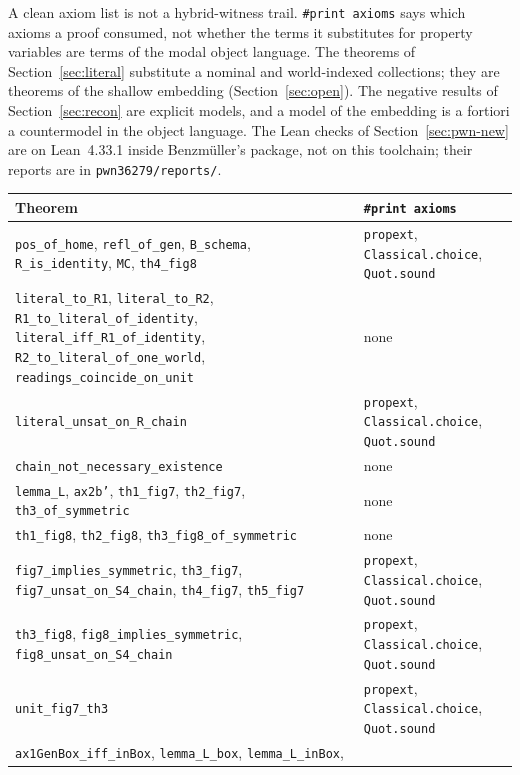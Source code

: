 \documentclass[11pt,a4paper]{article}
\newcommand{\lean}[1]{\texttt{#1}}
\theoremstyle{definition}
\theoremstyle{remark}
\begin{document}
A clean axiom list is not a hybrid-witness trail.
\lean{\#print axioms} says which axioms a proof consumed, not whether the
terms it substitutes for property variables are terms of the modal object
language.
The theorems of Section~\ref{sec:literal} substitute a nominal and
world-indexed collections; they are theorems of the shallow embedding
(Section~\ref{sec:open}).
The negative results of Section~\ref{sec:recon} are explicit models, and a
model of the embedding is a fortiori a countermodel in the object language.
The Lean checks of Section~\ref{sec:pwn-new} are on Lean~4.33.1 inside
Benzm\"uller's package, not on this toolchain; their reports are in
\lean{pwn36279/reports/}.

\begin{table}[t]
\centering
\footnotesize
\begin{tabular}{@{}>{\raggedright\arraybackslash}p{}>{\raggedright\arraybackslash}p{}@{}}
\toprule
Theorem & \lean{\#print axioms} \\
\midrule
\lean{pos\_of\_home}, \lean{refl\_of\_gen}, \lean{B\_schema},
  \lean{R\_is\_identity}, \lean{MC}, \lean{th4\_fig8} &
  \lean{propext}, \lean{Classical.choice}, \lean{Quot.sound} \\
\lean{literal\_to\_R1}, \lean{literal\_to\_R2},
  \lean{R1\_to\_literal\_of\_identity},
  \lean{literal\_iff\_R1\_of\_identity},
  \lean{R2\_to\_literal\_of\_one\_world},
  \lean{readings\_coincide\_on\_unit} &
  none \\
\lean{literal\_unsat\_on\_R\_chain} &
  \lean{propext}, \lean{Classical.choice}, \lean{Quot.sound} \\
\lean{chain\_not\_necessary\_existence} &
  none \\
\lean{lemma\_L}, \lean{ax2b'}, \lean{th1\_fig7}, \lean{th2\_fig7},
  \lean{th3\_of\_symmetric} &
  none \\
\lean{th1\_fig8}, \lean{th2\_fig8}, \lean{th3\_fig8\_of\_symmetric} &
  none \\
\lean{fig7\_implies\_symmetric}, \lean{th3\_fig7},
  \lean{fig7\_unsat\_on\_S4\_chain}, \lean{th4\_fig7}, \lean{th5\_fig7} &
  \lean{propext}, \lean{Classical.choice}, \lean{Quot.sound} \\
\lean{th3\_fig8}, \lean{fig8\_implies\_symmetric},
  \lean{fig8\_unsat\_on\_S4\_chain} &
  \lean{propext}, \lean{Classical.choice}, \lean{Quot.sound} \\
\lean{unit\_fig7\_th3} &
  \lean{propext}, \lean{Classical.choice}, \lean{Quot.sound} \\
\lean{ax1GenBox\_iff\_inBox}, \lean{lemma\_L\_box}, \lean{lemma\_L\_inBox},

\end{tabular}
\end{table}
\end{document}
